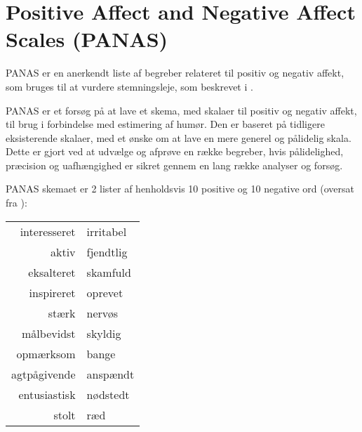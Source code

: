 \section{Positive Affect and Negative Affect Scales (PANAS)}\label{panas}
PANAS er en anerkendt liste af begreber relateret til positiv og negativ affekt, som bruges til at vurdere stemningsleje, som beskrevet i \citet{panas}.


PANAS er et forsøg på at lave et skema, med skalaer til positiv og negativ affekt, til brug i forbindelse med estimering af humør.
Den er baseret på tidligere eksisterende skalaer, med et ønske om at lave en mere generel og pålidelig skala.
Dette er gjort ved at udvælge og afprøve en række begreber, hvis pålidelighed, præcision og uafhængighed er sikret gennem en lang række analyser og forsøg.

PANAS skemaet er 2 lister af henholdsvis 10 positive og 10 negative ord (oversat fra \citet{panas}):\\
\begin{center}
\begin{tabular}{r | l}
interesseret & irritabel \\\newline
aktiv & fjendtlig \\\newline
eksalteret & skamfuld \\\newline
inspireret & oprevet \\\newline
stærk & nervøs \\\newline
målbevidst & skyldig \\\newline
opmærksom & bange \\\newline
agtpågivende & anspændt \\\newline
entusiastisk & nødstedt \\\newline
stolt & ræd
\end{tabular}
\end{center}


